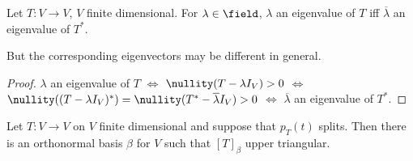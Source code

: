 \begin{corollary}\label{cor:eigenvaluesofadjoint}
    Let $T : V \to V$, $V$ finite dimensional. For $\lambda \in \field$, $\lambda$ an eigenvalue of $T$ iff $\overline{\lambda}$ an eigenvalue of $T^\ast$.
\end{corollary}

\begin{remark}
    But the corresponding eigenvectors may be different in general.
\end{remark}

\begin{proof}
    $\lambda$ an eigenvalue of $T$ $\iff$ $\nullity(T - \lambda I_V) > 0$ $\iff$ $\nullity((T - \lambda I_V)^\ast) = \nullity(T^\ast - \overline{\lambda} I_V) > 0$ $\iff$ $\overline{\lambda}$ an eigenvalue of $T^\ast$.
\end{proof}

\begin{lemma}\label{lemma:schurs}
    Let $T : V \to V$ on $V$ finite dimensional and suppose that $p_T(t)$ splits. Then there is an orthonormal basis $\beta$ for $V$ such that $[T]_\beta$ upper triangular.
\end{lemma}

